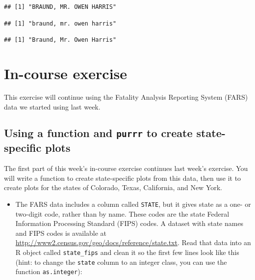 \documentclass[]{book}
\makeatletter
\newenvironment{Shaded}{\begin{snugshade}}{\end{snugshade}}
\newcommand{\KeywordTok}[1]{\textcolor[rgb]{0.13,0.29,0.53}{\textbf{#1}}}
\newcommand{\DecValTok}[1]{\textcolor[rgb]{0.00,0.00,0.81}{#1}}
\newcommand{\OperatorTok}[1]{\textcolor[rgb]{0.81,0.36,0.00}{\textbf{#1}}}
\newcommand{\NormalTok}[1]{#1}
\providecommand{\tightlist}{%
  \setlength{\itemsep}{0pt}\setlength{\parskip}{0pt}}
\newenvironment{kframe}{%
\medskip{}
\setlength{\fboxsep}{.8em}
 \def\at@end@of@kframe{}%
 \ifinner\ifhmode%
  \def\at@end@of@kframe{\end{minipage}}%
  \begin{minipage}{\columnwidth}%
 \fi\fi%
 \def\FrameCommand##1{\hskip\@totalleftmargin \hskip-\fboxsep
 \colorbox{shadecolor}{##1}\hskip-\fboxsep
     \hskip-\linewidth \hskip-\@totalleftmargin \hskip\columnwidth}%
 \MakeFramed {\advance\hsize-\width
   \@totalleftmargin\z@ \linewidth\hsize
   \@setminipage}}%
 {\par\unskip\endMakeFramed%
 \at@end@of@kframe}
\renewenvironment{Shaded}{\begin{kframe}}{\end{kframe}}
\theoremstyle{definition}
\theoremstyle{definition}
\theoremstyle{definition}
\theoremstyle{remark}
\makeatother
\begin{document}
\begin{verbatim}
## [1] "BRAUND, MR. OWEN HARRIS"
\end{verbatim}

\begin{Shaded}
\end{Shaded}

\begin{verbatim}
## [1] "braund, mr. owen harris"
\end{verbatim}

\begin{Shaded}
\end{Shaded}

\begin{verbatim}
## [1] "Braund, Mr. Owen Harris"
\end{verbatim}

\section{In-course exercise}\label{in-course-exercise-7}

This exercise will continue using the Fatality Analysis Reporting System
(FARS) data we started using last week.

\subsection{\texorpdfstring{Using a function and \texttt{purrr} to
create state-specific
plots}{Using a function and purrr to create state-specific plots}}\label{using-a-function-and-purrr-to-create-state-specific-plots-1}

The first part of this week's in-course exercise continues last week's
exercise. You will write a function to create state-specific plots from
this data, then use it to create plots for the states of Colorado,
Texas, California, and New York.

\begin{itemize}
\tightlist
\item
  The FARS data includes a column called \texttt{STATE}, but it gives
  state as a one- or two-digit code, rather than by name. These codes
  are the state Federal Information Processing Standard (FIPS) codes. A
  dataset with state names and FIPS codes is available at
  \url{http://www2.census.gov/geo/docs/reference/state.txt}. Read that
  data into an R object called \texttt{state\_fips} and clean it so the
  first few lines look like this (hint: to change the \texttt{state}
  column to an integer class, you can use the function
  \texttt{as.integer}):
\end{itemize}
\end{document}
